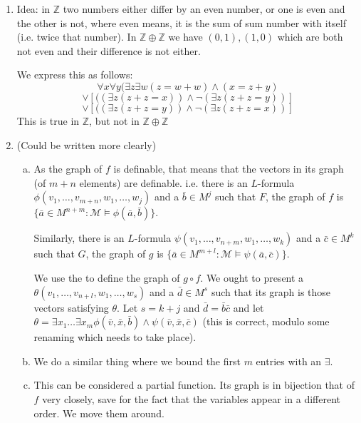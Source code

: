 \documentclass[10pt]{article}
\newcommand{\after}{\circ }
\newcommand{\Z}{\mathbb{Z}}
\newcommand{\A}{\forall}
\newcommand{\E}{\exists}
\begin{document}
\begin{enumerate}[1.]
\begin{enumerate}
	\item
	
	\end{enumerate}

\item Idea: in $\Z$ two numbers either differ by an even number, or one is even and the other is not, where even means, it is the sum of sum number with itself (i.e. twice that number). In $\Z \oplus \Z$ we have $(0, 1), (1, 0)$ which are both not even and their difference is not either. 

We express this as follows: \[\A x\A y (\E z \E w (z = w + w) \land (x = z + y)\]\[ \lor [((\E z (z + z = x)) \land \neg (\E z (z + z = y))]\]\[ \lor [((\E z (z + z = y)) \land \neg (\E z (z + z = x))]\] This is true in $\Z$, but not in $\Z \oplus \Z$

\item (Could be written more clearly)
	\begin{enumerate}[a)]
	\item As the graph of $f$ is definable, that means that the vectors in its graph (of $m + n$ elements) are definable. i.e. there is an $L$-formula $\phi(v_1, \ldots, v_{m+n}, w_1, \ldots, w_j)$ and a $\bar{b} \in M^j$ such that $F$, the graph of $f$ is $\{\bar{a} \in M^{n+m} : \mathcal{M} \models \phi(\bar{a}, \bar{b})\}$. 
	
	Similarly, there is an $L$-formula $\psi(v_1, \ldots, v_{n+m}, w_1, \ldots, w_k)$ and a $\bar{c} \in M^k$ such that $G$, the graph of $g$ is $\{\bar{a} \in M^{m+l} : \mathcal{M} \models \psi(\bar{a}, \bar{c})\}$.
	
	We use the to define the graph of $g \after f$. We ought to present a $\theta(v_1, \ldots, v_{n+l}, w_1, \ldots, w_s)$ and a $\bar{d} \in M^s$ such that its graph is those vectors satisfying $\theta$. Let $s = k + j$ and $\bar{d} = \bar{b}\bar{c}$ and let $\theta = \E x_1 \ldots \E x_m \phi(\bar{v}, \bar{x}, \bar{b}) \land \psi(\bar{v}, \bar{x}, \bar{c})$ (this is correct, modulo some renaming which needs to take place). 
	
	\item We do a similar thing where we bound the first $m$ entries with an $\E$. 
	
	\item This can be considered a partial function. Its graph is in bijection that of $f$ very closely, save for the fact that the variables appear in a different order. We move them around. 
	
	\end{enumerate}


\end{enumerate}
\end{document}
